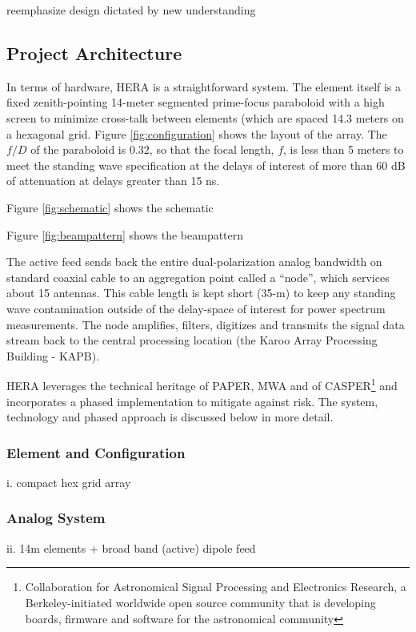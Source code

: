 \documentclass[preprint]{aastex}
\begin{document}
reemphasize design dictated by new understanding

\subsection{Project Architecture}  %
In terms of hardware, HERA is a straightforward system.  The element
itself is a fixed zenith-pointing 14-meter segmented prime-focus paraboloid with a high screen
to minimize cross-talk between elements (which are spaced 14.3 meters on a
hexagonal grid.  Figure \ref{fig:configuration} shows the layout of the array.  The $f/D$ of
the paraboloid is 0.32, so that the focal length, $f$, is less than 5 meters to meet the 
standing wave specification at the delays of interest of more than 60 dB of attenuation at delays 
greater than 15 ns.

Figure \ref{fig:schematic} shows the schematic

Figure \ref{fig:beampattern} shows the beampattern

The active feed sends back the entire dual-polarization analog bandwidth on standard
coaxial cable to an aggregation point called a ``node'', which services 
about 15 antennas.  This cable length is kept short (35-m) to keep any standing
wave contamination outside of the delay-space of interest for power spectrum
measurements.  The node amplifies, filters, digitizes and transmits the signal data stream
back to the central processing location (the Karoo Array Processing Building - KAPB).

HERA leverages the technical heritage of PAPER, MWA and of CASPER\footnote{Collaboration for Astronomical
Signal Processing and Electronics Research, a Berkeley-initiated worldwide open source community that is
developing boards, firmware and software for the astronomical community} and incorporates a
phased implementation to mitigate against risk.  The system, technology and phased approach is discussed below
in more detail.

\subsubsection{Element and Configuration}
i. compact hex grid array

\subsubsection{Analog System}
ii. 14m elements + broad band (active) dipole feed
\end{document}
